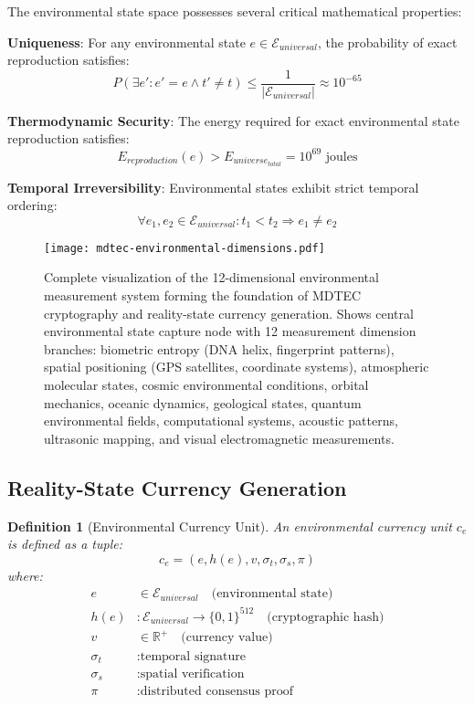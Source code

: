 \documentclass[12pt,a4paper]{article}
\newtheorem{definition}[theorem]{Definition}
\begin{document}
The environmental state space possesses several critical mathematical properties:

\textbf{Uniqueness}: For any environmental state $e \in \mathcal{E}_{universal}$, the probability of exact reproduction satisfies:
\begin{equation}
P(\exists e' : e' = e \land t' \neq t) \leq \frac{1}{|\mathcal{E}_{universal}|} \approx 10^{-65}
\end{equation}

\textbf{Thermodynamic Security}: The energy required for exact environmental state reproduction satisfies:
\begin{equation}
E_{reproduction}(e) > E_{universe_{total}} = 10^{69} \text{ joules}
\end{equation}

\textbf{Temporal Irreversibility}: Environmental states exhibit strict temporal ordering:
\begin{equation}
\forall e_1, e_2 \in \mathcal{E}_{universal} : t_1 < t_2 \Rightarrow e_1 \neq e_2
\end{equation}

\begin{figure}[H]
\centering
\texttt{[image: mdtec-environmental-dimensions.pdf]}
\caption{Complete visualization of the 12-dimensional environmental measurement system forming the foundation of MDTEC cryptography and reality-state currency generation. Shows central environmental state capture node with 12 measurement dimension branches: biometric entropy (DNA helix, fingerprint patterns), spatial positioning (GPS satellites, coordinate systems), atmospheric molecular states, cosmic environmental conditions, orbital mechanics, oceanic dynamics, geological states, quantum environmental fields, computational systems, acoustic patterns, ultrasonic mapping, and visual electromagnetic measurements.}
\label{fig:environmental_dimensions}
\end{figure}

\subsection{Reality-State Currency Generation}

\begin{definition}[Environmental Currency Unit]
An environmental currency unit $c_e$ is defined as a tuple:
\begin{equation}
c_e = (e, h(e), v, \sigma_t, \sigma_s, \pi)
\end{equation}
where:
\begin{align}
e &\in \mathcal{E}_{universal} \quad \text{(environmental state)} \\
h(e) &: \mathcal{E}_{universal} \to \{0,1\}^{512} \quad \text{(cryptographic hash)} \\
v &\in \mathbb{R}^+ \quad \text{(currency value)} \\
\sigma_t &: \text{temporal signature} \\
\sigma_s &: \text{spatial verification} \\
\pi &: \text{distributed consensus proof}
\end{align}
\end{definition}
\end{document}
